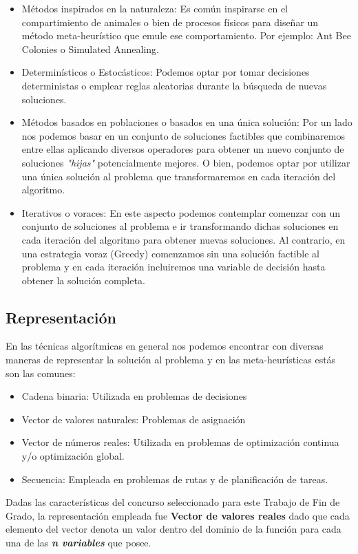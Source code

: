 \begin{itemize}
    \item Métodos inspirados en la naturaleza: Es común inspirarse en el compartimiento de animales o bien de procesos físicos para diseñar un método meta-heurístico que emule ese comportamiento. Por ejemplo: Ant Bee Colonies o Simulated Annealing.
    \item Determinísticos o Estocásticos: Podemos optar por tomar decisiones deterministas o emplear reglas aleatorias durante la búsqueda de nuevas soluciones.
    \item Métodos basados en poblaciones o basados en una única solución: Por un lado nos podemos basar en un conjunto de soluciones factibles que combinaremos entre ellas aplicando diversos operadores para obtener un  nuevo conjunto de soluciones \textit{"hijas"} potencialmente mejores. O bien, podemos optar por utilizar una única solución al problema que transformaremos en cada iteración del algoritmo.
    \item Iterativos o voraces: En este aspecto podemos contemplar comenzar con un conjunto de soluciones al problema e ir transformando dichas soluciones en cada iteración del algoritmo para obtener nuevas soluciones. Al contrario, en una estrategia voraz (Greedy) comenzamos sin una solución factible al problema y en cada iteración incluiremos una variable de decisión hasta obtener la solución completa.
\end{itemize}

\subsection{Representación}

En las técnicas algorítmicas en general nos podemos encontrar con diversas maneras de representar la solución al problema y en las meta-heurísticas estás son las comunes\cite{metaheuristics}:

\bigskip

\begin{itemize}
    \item Cadena binaria: Utilizada en problemas de decisiones 
    \item Vector de valores naturales: Problemas de asignación
    \item Vector de números reales: Utilizada en problemas de optimización continua y/o optimización global.
    \item Secuencia: Empleada en problemas de rutas y de planificación de tareas.
\end{itemize}

Dadas las características del concurso seleccionado para este Trabajo de Fin de Grado, la representación empleada fue \textbf{Vector de valores reales} dado que cada elemento del vector denota un valor dentro del dominio de la función para cada una de las \textbf{\textit{n variables}} que posee.
